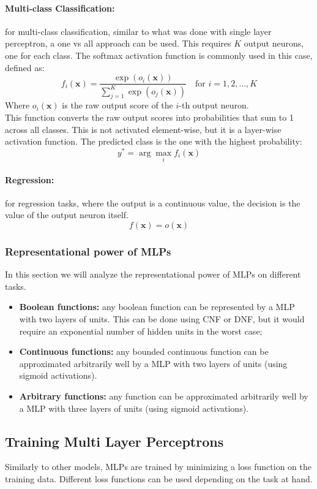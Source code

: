 \paragraph{Multi-class Classification:} for multi-class classification, similar to what was done with single layer perceptron, a one vs all approach can be used.
This requires $K$ output neurons, one for each class. 
The softmax activation function is commonly used in this case, defined as:
\[ f_i(\boldsymbol{x}) = \frac{\exp(o_i(\boldsymbol{x}))}{\sum_{j=1}^{K} \exp(o_j(\boldsymbol{x}))} \quad \text{for } i = 1, 2, \ldots, K \]
Where $o_i(\boldsymbol{x})$ is the raw output score of the $i$-th output neuron.
\\This function converts the raw output scores into probabilities that sum to 1 across all classes. This is not activated element-wise, but
it is a layer-wise activation function.
The predicted class is the one with the highest probability:
\[ y^* = \arg\max_{i} f_i(\boldsymbol{x}) \] 

\paragraph{Regression:} for regression tasks, where the output is a continuous value, the decision is the value of the output neuron itself.
\[f(\boldsymbol{x}) = o(\boldsymbol{x}) \]

\subsubsection{Representational power of MLPs}
In this section we will analyze the representational power of MLPs on different tasks.
\begin{itemize}
    \item \textbf{Boolean functions:} any boolean function can be represented by a MLP with two layers of units. This can be done using CNF or DNF, but it would require
    an exponential number of hidden units in the worst case;
    \item \textbf{Continuous functions:} any bounded continuous function can be approximated arbitrarily well by a MLP with two layers of units (using sigmoid activations).
    \item \textbf{Arbitrary functions:} any function can be approximated arbitrarily well by a MLP with three layers of units (using sigmoid activations).
\end{itemize}

\subsection{Training Multi Layer Perceptrons}
Similarly to other models, MLPs are trained by minimizing a loss function on the training data. Different loss functions can be used depending on the task at hand.
